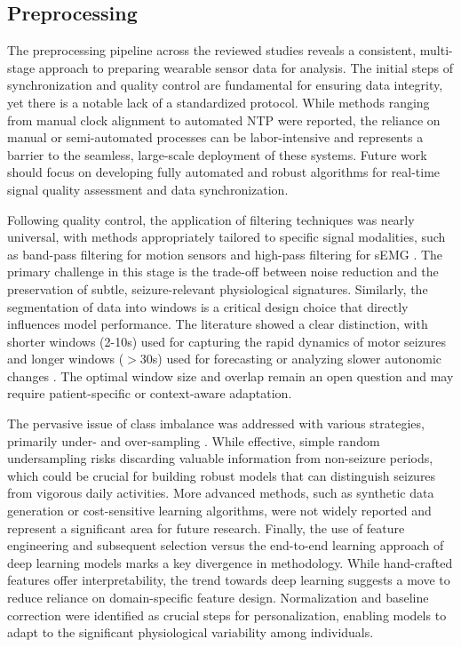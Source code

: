 \subsection{Preprocessing}
The preprocessing pipeline across the reviewed studies reveals a consistent, multi-stage approach to preparing wearable sensor data for analysis. The initial steps of synchronization and quality control are fundamental for ensuring data integrity, yet there is a notable lack of a standardized protocol. While methods ranging from manual clock alignment \cite{Yu2023-ss} to automated NTP \cite{Vakilna2024-hk} were reported, the reliance on manual or semi-automated processes can be labor-intensive and represents a barrier to the seamless, large-scale deployment of these systems. Future work should focus on developing fully automated and robust algorithms for real-time signal quality assessment and data synchronization.

Following quality control, the application of filtering techniques was nearly universal, with methods appropriately tailored to specific signal modalities, such as band-pass filtering for motion sensors \cite{Wu2024-yl, De_Cooman2018-pq} and high-pass filtering for sEMG \cite{Milosevic2016-ee}. The primary challenge in this stage is the trade-off between noise reduction and the preservation of subtle, seizure-relevant physiological signatures. Similarly, the segmentation of data into windows is a critical design choice that directly influences model performance. The literature showed a clear distinction, with shorter windows (2-10s) used for capturing the rapid dynamics of motor seizures \cite{Milosevic2016-ee, Larsen2024-vn} and longer windows ($>$30s) used for forecasting or analyzing slower autonomic changes \cite{Meisel2020-ii, Jiang2022-zu}. The optimal window size and overlap remain an open question and may require patient-specific or context-aware adaptation.

The pervasive issue of class imbalance was addressed with various strategies, primarily under- and over-sampling \cite{Yu2023-ss, Tang2021-td, Larsen2024-vn}. While effective, simple random undersampling risks discarding valuable information from non-seizure periods, which could be crucial for building robust models that can distinguish seizures from vigorous daily activities. More advanced methods, such as synthetic data generation or cost-sensitive learning algorithms, were not widely reported and represent a significant area for future research. Finally, the use of feature engineering and subsequent selection \cite{Ge2023-ab, Xu2022-tx} versus the end-to-end learning approach of deep learning models marks a key divergence in methodology. While hand-crafted features offer interpretability, the trend towards deep learning suggests a move to reduce reliance on domain-specific feature design. Normalization and baseline correction \cite{Jiang2022-zu, Nasseri2021-xn} were identified as crucial steps for personalization, enabling models to adapt to the significant physiological variability among individuals.

